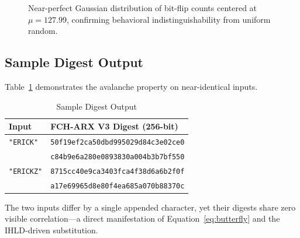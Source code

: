 \documentclass[12pt,journal]{IEEEtran}
\begin{document}
\begin{figure}[H]
\centering
{}
\caption{Near-perfect Gaussian distribution of bit-flip counts centered at
$\mu=127.99$, confirming behavioral indistinguishability from uniform random.}
\label{fig:sac}
\end{figure}

\subsection{Sample Digest Output}

Table~\ref{tab:digests} demonstrates the avalanche property on near-identical
inputs.

\begin{table}[H]
\centering
\caption{Sample Digest Output}
\label{tab:digests}
\renewcommand{\arraystretch}{1.3}
\begin{tabular}{p{1.5cm} p{6cm}}
\toprule
\textbf{Input} & \textbf{FCH-ARX V3 Digest (256-bit)} \\
\midrule
\texttt{"ERICK"}  &
  \texttt{\small 50f19ef2ca50dbd995029d84c3e02ce0}\\
  & \texttt{\small c84b9e6a280e0893830a004b3b7bf550}\\
\midrule
\texttt{"ERICKZ"} &
  \texttt{\small 8715cc40e9ca3403fca4f38d6a6b2f0f}\\
  & \texttt{\small a17e69965d8e80f4ea685a070b88370c}\\
\bottomrule
\end{tabular}
\end{table}

The two inputs differ by a single appended character, yet their digests share
zero visible correlation---a direct manifestation of Equation~\eqref{eq:butterfly}
and the IHLD-driven substitution.
\end{document}
